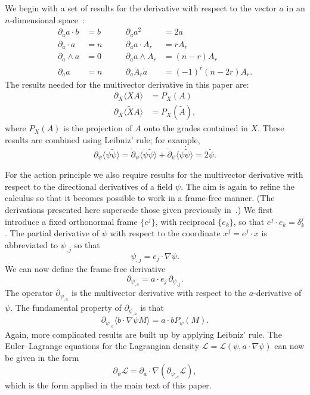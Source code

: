 \documentclass[a4paper]{article}
\numberwithin{equation}{section}
\newcommand{\dt}{\! \cdot \!}
\newcommand{\wdg}{\! \wedge \!}
\newcommand{\la}{\langle}
\newcommand{\ra}{\rangle}
\newcommand{\eqv}{=}
\newcommand{\cll}{{\mathcal{L}}}
\newcommand{\da}{\partial_a}
\newcommand{\dX}{\partial_X}
\newcommand{\dpsi}{\partial_{\psi}}
\newcommand{\psirev}{\tilde{\psi}}
\newcommand{\psidot}{\dot{\psi}}
\newcommand{\grad}{\nabla}
\newcommand{\pardot}{\dot{\partial}}
\begin{document}
We begin with a set of results for the derivative with respect to the
vector $a$ in an $n$-dimensional space~\cite{hes-gc}:
%
\begin{equation}
\begin{alignedat}{2}
\da a \dt b &= b &\qquad \da  a^2 &= 2a  \\
\da \dt a  &= n  &\qquad \da a \dt A_r  &= rA_r \\
\da \wdg a  &= 0  &\qquad \da a \wdg A_r  &= (n-r)A_r \\
\da a  &= n  &\qquad \pardot_a A_r \dot{a}  &= (-1)^r (n-2r)A_r. 
\end{alignedat}
\end{equation}
%
The results needed for the multivector derivative in this paper
are:
%
\begin{equation}
\begin{aligned} 
\dX \la X A \ra &= P_{X}(A) \\
\dX \la \tilde{X} A \ra &= P_{X}(\tilde{A}), 
\end{aligned}
\end{equation} 
%
where $ P_{X}(A)$ is the projection of $A$ onto the grades contained
in $X$.  These results are combined using Leibniz' rule; for
example,
%
\begin{equation}
\dpsi \la \psi \psirev \ra = \pardot_\psi \la \psidot \psirev \ra + 
\pardot_\psi \la \psi \dot{\psirev} \ra = 2 \psirev.
\end{equation}


For the action principle we also require results for the multivector
derivative with respect to the directional derivatives of a field
$\psi$.  The aim is again to refine the calculus so that it becomes
possible to work in a frame-free manner.  (The derivations presented
here supersede those given previously in~\cite{DGL93-lft}.)  We first
introduce a fixed orthonormal frame $\{e^j\}$, with reciprocal
$\{e_k\}$, so that $e^j \dt e_k = \delta_k^j$.  The partial derivative
of $\psi$ with respect to the coordinate $x^j=e^j \dt x$ is
abbreviated to $\psi_{,j}$ so that
%
\begin{equation}
\psi_{,j} \eqv e_j \dt \grad \psi.
\end{equation}
%
We can now define the frame-free derivative
%
\begin{equation}
\partial_{\psi_{,a}} \eqv a \dt e_j \, \partial_{\psi_{,j}}.
\end{equation}
%
The operator $\partial_{\psi_{,a}}$ is the multivector derivative with
respect to the $a$-derivative of $\psi$.  The fundamental property of
$\partial_{\psi_{,a}}$ is that
%
\begin{equation}
\partial_{\psi_{,a}} \la b \dt \grad \psi M \ra = a \dt b P_\psi(M).
\end{equation}
%
Again, more complicated results are built up by applying Leibniz'
rule.  The Euler--Lagrange equations for the Lagrangian density
$\cll=\cll(\psi, a\dt\grad\psi)$ can now be given in the form
%
\begin{equation}
\dpsi \cll = \da \dt \grad (\partial_{\psi_{,a}} \cll),
\end{equation}
%
which is the form applied in the main text of this paper.
\end{document}
